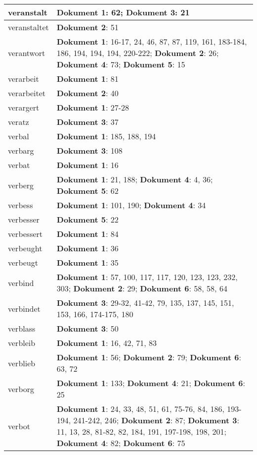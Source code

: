 \documentclass[a5paper]{article}
\begin{document}
\begin{longtable}[l]{|l|p{3in}|}
\hline
veranstalt & \textbf{Dokument 1}: 62; \textbf{Dokument 3}: 21 \\
\hline
veranstaltet & \textbf{Dokument 2}: 51 \\
\hline
verantwort & \textbf{Dokument 1}: 16-17, 24, 46, 87, 87, 119, 161, 183-184, 186, 194, 194, 194, 220-222; \textbf{Dokument 2}: 26; \textbf{Dokument 4}: 73; \textbf{Dokument 5}: 15 \\
\hline
verarbeit & \textbf{Dokument 1}: 81 \\
\hline
verarbeitet & \textbf{Dokument 2}: 40 \\
\hline
verargert & \textbf{Dokument 1}: 27-28 \\
\hline
veratz & \textbf{Dokument 3}: 37 \\
\hline
verbal & \textbf{Dokument 1}: 185, 188, 194 \\
\hline
verbarg & \textbf{Dokument 3}: 108 \\
\hline
verbat & \textbf{Dokument 1}: 16 \\
\hline
verberg & \textbf{Dokument 1}: 21, 188; \textbf{Dokument 4}: 4, 36; \textbf{Dokument 5}: 62 \\
\hline
verbess & \textbf{Dokument 1}: 101, 190; \textbf{Dokument 4}: 34 \\
\hline
verbesser & \textbf{Dokument 5}: 22 \\
\hline
verbessert & \textbf{Dokument 1}: 84 \\
\hline
verbeught & \textbf{Dokument 1}: 36 \\
\hline
verbeugt & \textbf{Dokument 1}: 35 \\
\hline
verbind & \textbf{Dokument 1}: 57, 100, 117, 117, 120, 123, 123, 232, 303; \textbf{Dokument 2}: 29; \textbf{Dokument 6}: 58, 58, 64 \\
\hline
verbindet & \textbf{Dokument 3}: 29-32, 41-42, 79, 135, 137, 145, 151, 153, 166, 174-175, 180 \\
\hline
verblass & \textbf{Dokument 3}: 50 \\
\hline
verbleib & \textbf{Dokument 1}: 16, 42, 71, 83 \\
\hline
verblieb & \textbf{Dokument 1}: 56; \textbf{Dokument 2}: 79; \textbf{Dokument 6}: 63, 72 \\
\hline
verborg & \textbf{Dokument 1}: 133; \textbf{Dokument 4}: 21; \textbf{Dokument 6}: 25 \\
\hline
verbot & \textbf{Dokument 1}: 24, 33, 48, 51, 61, 75-76, 84, 186, 193-194, 241-242, 246; \textbf{Dokument 2}: 87; \textbf{Dokument 3}: 11, 13, 28, 81-82, 82, 184, 191, 197-198, 198, 201; \textbf{Dokument 4}: 82; \textbf{Dokument 6}: 75 \\

\end{longtable}
\end{document}
